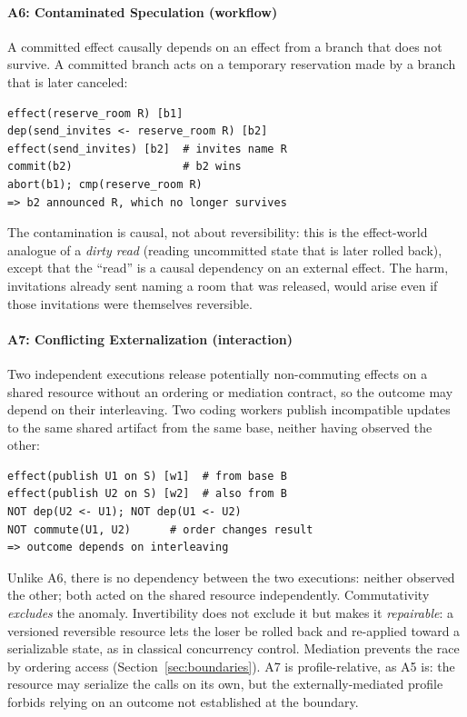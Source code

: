 \documentclass{article}
\begin{document}
\paragraph{A6: Contaminated Speculation (workflow)}
A committed effect causally depends on an effect from a branch that
does not survive. A committed branch acts on a temporary reservation made
by a branch that is later canceled:
\par\vspace{2pt}\noindent\begin{minipage}{\linewidth}
\begingroup\footnotesize\begin{verbatim}
effect(reserve_room R) [b1]
dep(send_invites <- reserve_room R) [b2]
effect(send_invites) [b2]  # invites name R
commit(b2)                 # b2 wins
abort(b1); cmp(reserve_room R)
=> b2 announced R, which no longer survives
\end{verbatim}\endgroup
\end{minipage}\par\noindent
The contamination is causal, not about reversibility: this is the
effect-world analogue of a \emph{dirty read} (reading uncommitted state that is later rolled back), except that the ``read'' is a causal dependency on
an external effect. The harm, invitations already sent naming a room that
was released, would arise even if those invitations were themselves
reversible.

\paragraph{A7: Conflicting Externalization (interaction)}
Two independent executions release potentially non-commuting effects
on a shared resource without an ordering or mediation contract, so the
outcome may depend on their interleaving. Two coding workers publish
incompatible updates to the same shared artifact from the same base,
neither having observed the other:
\par\vspace{2pt}\noindent\begin{minipage}{\linewidth}
\begingroup\footnotesize\begin{verbatim}
effect(publish U1 on S) [w1]  # from base B
effect(publish U2 on S) [w2]  # also from B
NOT dep(U2 <- U1); NOT dep(U1 <- U2)
NOT commute(U1, U2)      # order changes result
=> outcome depends on interleaving
\end{verbatim}\endgroup
\end{minipage}\par\noindent
Unlike A6, there is no dependency between the two executions: neither
observed the other; both acted on the shared resource independently.
Commutativity \emph{excludes} the anomaly. Invertibility does not exclude
it but makes it \emph{repairable}: a versioned reversible resource lets
the loser be rolled back and re-applied toward a serializable state, as in
classical concurrency control. Mediation prevents the race by ordering
access (Section~\ref{sec:boundaries}). A7 is profile-relative, as A5 is:
the resource may serialize the calls on its own, but the externally-mediated
profile forbids relying on an outcome not established at the boundary.
\end{document}

